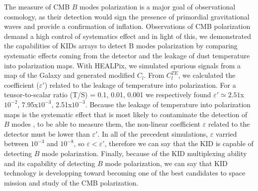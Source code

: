 The measure of CMB $B$ modes polarization is a major goal of observational cosmology, as their detection would sign the presence of primordial gravitational waves and provide a confirmation of inflation. Observations of CMB polarization demand a high control of systematics effect and in light of this, we demonstrated the capabilities of KIDs arrays to detect B modes polarization by comparing systematic effects coming from the detector and the leakage of dust temperature into polarization maps. With HEALPix, we simulated spurious signals from a map of the Galaxy and generated modified $C_{l}$. From $C_{l}^{TE}$, we calculated the coefficient ($\varepsilon'$) related to the leakage of temperature into polarization. For a tensor-to-scalar ratio (T/S) = 0.1, 0.01, 0.001 we respectively found $\varepsilon' \simeq 2.51$x$10^{-2}$, 7.95x$10^{-3}$, 2.51x$10^{-3}$. Because the leakage of temperature into polarization maps is the systematic effect that is most likely to contaminate the detection of $B$ modes , to be able to measure them, the non-linear coefficient $\varepsilon$ related to the detector must be lower than $\varepsilon'$. In all of the precedent simulations, $\varepsilon $ varried between $10^{-3}$ and $10^{-8}$, so $\varepsilon < \varepsilon'$, therefore we can say that the KID is capable of detecting $B$ mode polarization. Finally, because of the KID multiplexing ability and its capability of detecting $B$ mode polarization, we can say that KID technology is developping toward becoming one of the best candidates to space mission and study of the CMB polarization.
